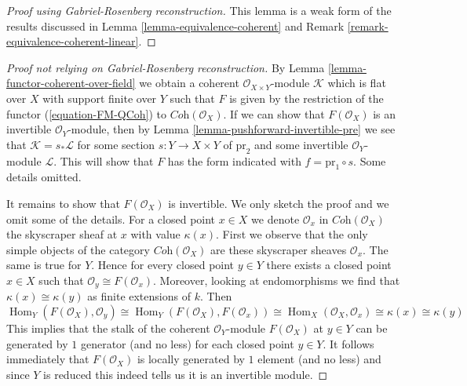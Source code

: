 \documentclass{stacks-project}
\theoremstyle{plain}
\theoremstyle{definition}
\theoremstyle{remark}
\numberwithin{equation}{subsection}
\def\Hom{\mathop{\mathrm{Hom}}\nolimits}
\begin{document}
\begin{proof}[Proof using Gabriel-Rosenberg reconstruction]
This lemma is a weak form of the results discussed in
Lemma \ref{lemma-equivalence-coherent} and
Remark \ref{remark-equivalence-coherent-linear}.
\end{proof}

\begin{proof}[Proof not relying on Gabriel-Rosenberg reconstruction]
By Lemma \ref{lemma-functor-coherent-over-field} we obtain a coherent
$\mathcal{O}_{X \times Y}$-module $\mathcal{K}$ which is flat
over $X$ with support finite over $Y$ such that $F$ is given by
the restriction of the functor
(\ref{equation-FM-QCoh}) to $\textit{Coh}(\mathcal{O}_X)$.
If we can show that $F(\mathcal{O}_X)$ is an invertible $\mathcal{O}_Y$-module,
then by Lemma \ref{lemma-pushforward-invertible-pre}
we see that $\mathcal{K} = s_*\mathcal{L}$
for some section $s : Y \to X \times Y$ of $\text{pr}_2$ and some
invertible $\mathcal{O}_Y$-module $\mathcal{L}$.
This will show that $F$ has the form indicated with
$f = \text{pr}_1 \circ s$. Some details omitted.

\medskip\noindent
It remains to show that $F(\mathcal{O}_X)$ is invertible. We only
sketch the proof and we omit some of the details.
For a closed point $x \in X$ we denote
$\mathcal{O}_x$ in $\textit{Coh}(\mathcal{O}_X)$
the skyscraper sheaf at $x$ with value $\kappa(x)$.
First we observe that the only simple objects
of the category $\textit{Coh}(\mathcal{O}_X)$
are these skyscraper sheaves $\mathcal{O}_x$.
The same is true for $Y$. Hence for every closed point $y \in Y$
there exists a closed point $x \in X$ such that
$\mathcal{O}_y \cong F(\mathcal{O}_x)$. Moreover, looking at endomorphisms
we find that $\kappa(x) \cong \kappa(y)$ as finite extensions of $k$.
Then
$$
\Hom_Y(F(\mathcal{O}_X), \mathcal{O}_y) \cong
\Hom_Y(F(\mathcal{O}_X), F(\mathcal{O}_x)) \cong
\Hom_X(\mathcal{O}_X, \mathcal{O}_x) \cong \kappa(x) \cong \kappa(y)
$$
This implies that the stalk of the coherent $\mathcal{O}_Y$-module
$F(\mathcal{O}_X)$ at $y \in Y$ can be generated by $1$ generator
(and no less) for each closed point $y \in Y$. It follows immediately
that $F(\mathcal{O}_X)$ is locally generated by $1$ element (and no less)
and since $Y$ is reduced this indeed tells us it is an invertible module.
\end{proof}













\end{document}

